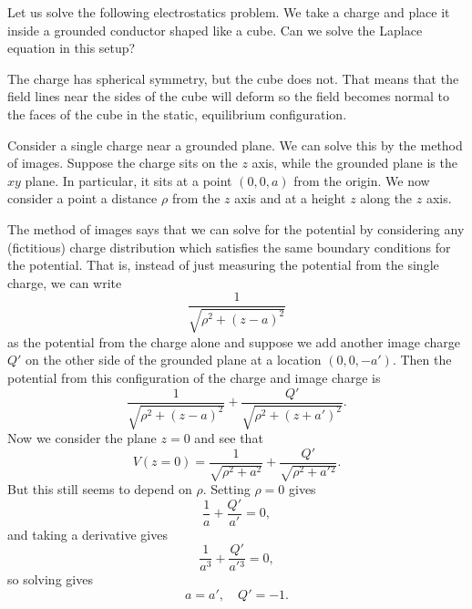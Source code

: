 \begin{exm}
    Let us solve the following electrostatics problem. We take a charge and place it inside a grounded conductor shaped like a cube. Can we solve the Laplace equation in this setup?

    The charge has spherical symmetry, but the cube does not. That means that the field lines near the sides of the cube will deform so the field becomes normal to the faces of the cube in the static, equilibrium configuration.
    
    Consider a single charge near a grounded plane. We can solve this by the method of images. Suppose the charge sits on the $z$ axis, while the grounded plane is the $xy$ plane. In particular, it sits at a point $(0,0,a)$ from the origin. We now consider a point a distance $\rho$ from the $z$ axis and at a height $z$ along the $z$ axis.
    
    The method of images says that we can solve for the potential by considering any (fictitious) charge distribution which satisfies the same boundary conditions for the potential. That is, instead of just measuring the potential from the single charge, we can write
    \begin{equation}
        \frac{1}{\sqrt{\rho^2+(z-a)^2}}
    \end{equation}
    as the potential from the charge alone and suppose we add another image charge $Q'$ on the other side of the grounded plane at a location $(0,0,-a')$. Then the potential from this configuration of the charge and image charge is
    \begin{equation}
        \frac{1}{\sqrt{\rho^2+(z-a)^2}}+ \frac{Q'}{\sqrt{\rho^2+(z+a')^2}}.
    \end{equation}
    Now we consider the plane $z=0$ and see that
    \begin{equation}
        V(z=0)=\frac{1}{\sqrt{\rho^2+a^2}} + \frac{Q'}{\sqrt{\rho^2+a'{}^2}}.
    \end{equation}
    But this still seems to depend on $\rho$. Setting $\rho=0$ gives
    \begin{equation}
        \frac{1}{a} + \frac{Q'}{a'} = 0,
    \end{equation}
    and taking a derivative gives
    \begin{equation}
        \frac{1}{a^3}+\frac{Q'}{a'{}^3} = 0,
    \end{equation}
    so solving gives
    \begin{equation}
        a=a', \quad Q'=-1.
    \end{equation}
    

\end{exm}
